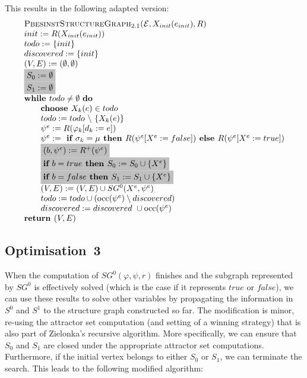 \documentclass{article}
\begin{document}
This results in the following adapted version:
\begin{equation*}
\begin{array}{l}
\textsc{PbesinstStructureGraph$_{2.1}$(}\mathcal{E}, X_{init}(e_{init}), R) \\ 
init:=R(X_{init}(e_{init})) \\
todo:=\{init\} \\
discovered:=\{init\} \\
(V,E) :=(\emptyset ,\emptyset ) \\ 
\colorbox{lightgray}{$%
S_0:= \emptyset $}\\
\colorbox{lightgray}{$%
S_1:= \emptyset $}\\
\text{\textbf{while }}todo\neq \emptyset \text{ \textbf{do}} \\ 
\qquad \text{\textbf{choose }}X_{k}(e)\in todo \\ 
\qquad todo:=todo\ \backslash \ \{X_{k}(e)\} \\ 
\qquad \psi ^{e}:=R(\varphi _{k}[d_{k}:=e]) \\ 
\qquad \psi^e := \textbf{ if } \sigma_k = \mu \textbf{ then } R(\psi^e[X^e := false])
\textbf{ else }  R(\psi^e[X^e := true]) \\
\qquad \colorbox{lightgray}{$%
(b,\psi^e) := R^+(\psi^e) $}\\
\qquad \colorbox{lightgray}{$%
\textbf{if $b = true$ then } S_0 := S_0 \cup \{ X^e \} $}\\
\qquad \colorbox{lightgray}{$%
\textbf{if $b = false$ then } S_1 := S_1 \cup \{ X^e \} $}\\
\qquad (V,E) := (V,E) \cup SG^{0}(X^{e},\psi ^{e}) \\ 
\qquad todo:=todo\cup (\mathrm{occ}(\psi ^{e})\setminus discovered) \\
\qquad discovered:=discovered\ \cup \mathrm{occ}(\psi ^{e}) \\
\text{\textbf{return }}(V, E)
\end{array}%
\end{equation*}%

\subsection{Optimisation~3}


When the computation of $SG^0(\varphi,\psi,r)$ finishes and the subgraph represented by $SG^0$ 
is effectively solved (which is the case if it represents $true$ or $false$), we can use these
results to solve other variables by propagating the information in $S^0$ and $S^1$ to
the structure graph constructed so far. The modification is minor, re-using the
attractor set computation (and setting of a winning strategy) that is also part of Zielonka's 
recursive algorithm. More
specifically, we can ensure that $S_0$ and $S_1$ are closed under the appropriate
attractor set computations. Furthermore, if the initial vertex belongs to either
$S_0$ or $S_1$, we can terminate the search. This leads to the following modified algorithm:
\end{document}
